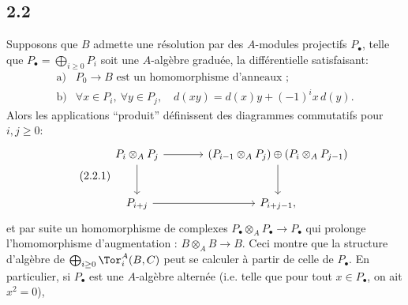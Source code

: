 \subsection*{2.2}
Supposons que \(B\) admette une résolution par des \(A\)-modules projectifs \(P_\bullet\), telle que \(P_\bullet=\bigoplus_{i\ge0}P_i\) soit une \(A\)-algèbre graduée, la différentielle satisfaisant:
\[
\begin{array}{ll}
\text{a)}& P_0\longrightarrow B\text{ est un homomorphisme d'anneaux~;}\\[0.4ex]
\text{b)}& \forall x\in P_i,\ \forall y\in P_j,\quad d(xy)=d(x)y+(-1)^i x\,d(y).
\end{array}
\]
Alors les applications ``produit'' définissent des diagrammes commutatifs pour \(i,j\ge0\):
\begin{equation}\tag{2.2.1}
\begin{tikzcd}[column sep=large,row sep=large]
P_i\otimes_A P_j \arrow[r] \arrow[d] & (P_{i-1}\otimes_A P_j)\oplus(P_i\otimes_A P_{j-1}) \arrow[d]\\
P_{i+j} \arrow[r] & P_{i+j-1},
\end{tikzcd}
\end{equation}
et par suite un homomorphisme de complexes \(P_\bullet\otimes_A P_\bullet\to P_\bullet\) qui prolonge l'homomorphisme d'augmentation : \(B\otimes_A B\to B\). Ceci montre que la structure d'algèbre de \(\bigoplus_{i\ge0}\Tor_i^A(B,C)\) peut se calculer à partir de celle de \(P_\bullet\). En particulier, si \(P_\bullet\) est une \(A\)-algèbre alternée (i.e. telle que pour tout \(x\in P_\bullet\), on ait \(x^2=0\)),
